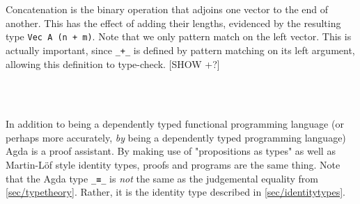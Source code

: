 Concatenation is the binary operation that adjoins one vector to the end of another.
This has the effect of adding their lengths, evidenced by the resulting type \texttt{Vec A (n + m)}.
Note that we only pattern match on the left vector. This is actually important, since \texttt{\_+\_} is defined
by pattern matching on its left argument, allowing this definition to type-check. [SHOW +?]
\begin{code}%
\>[0]\AgdaOperator{\AgdaFunction{\AgdaUnderscore{}++\AgdaUnderscore{}}}\AgdaSpace{}%
\AgdaSymbol{:}\AgdaSpace{}%
\AgdaSymbol{\{}\AgdaSpace{}%
\AgdaSymbol{:}\AgdaSpace{}%
\AgdaSymbol{\}}\AgdaSpace{}%
\AgdaSymbol{\{}\AgdaSpace{}%
\AgdaSpace{}%
\AgdaSymbol{:}\AgdaSpace{}%
\AgdaSymbol{\}}\AgdaSpace{}%
\AgdaSpace{}%
\AgdaSpace{}%
\AgdaSpace{}%
\AgdaSpace{}%
\AgdaSpace{}%
\AgdaSpace{}%
\AgdaSpace{}%
\AgdaSpace{}%
\AgdaSpace{}%
\AgdaSpace{}%
\AgdaSpace{}%
\AgdaSymbol{(}\AgdaSpace{}%
\AgdaOperator{\AgdaFunction{+}}\AgdaSpace{}%
\AgdaSymbol{)}\<%
\\
\>[0]\AgdaInductiveConstructor{[]}\AgdaSpace{}%
\AgdaOperator{\AgdaFunction{++}}\AgdaSpace{}%
\AgdaSpace{}%
\AgdaSymbol{=}\AgdaSpace{}%
\<%
\\
\>[0]\AgdaSymbol{(}\AgdaSpace{}%
\AgdaOperator{\AgdaInductiveConstructor{::}}\AgdaSpace{}%
\AgdaSymbol{)}\AgdaSpace{}%
\AgdaOperator{\AgdaFunction{++}}\AgdaSpace{}%
\AgdaSpace{}%
\AgdaSymbol{=}\AgdaSpace{}%
\AgdaSpace{}%
\AgdaOperator{\AgdaInductiveConstructor{::}}\AgdaSpace{}%
\AgdaSymbol{(}\AgdaSpace{}%
\AgdaOperator{\AgdaFunction{++}}\AgdaSpace{}%
\AgdaSymbol{)}\<%
\end{code}

In addition to being a dependently typed functional programming language
(or perhaps more accurately, \emph{by} being a dependently typed programming language)
Agda is a proof assistant. By making use of "propositions as types" as well as Martin-Löf style
identity types, proofs and programs are the same thing.
Note that the Agda type \texttt{\_≡\_} is \emph{not} the same as the judgemental equality from \autoref{sec/typetheory}.
Rather, it is the identity type described in \autoref{sec/identitytypes}.

